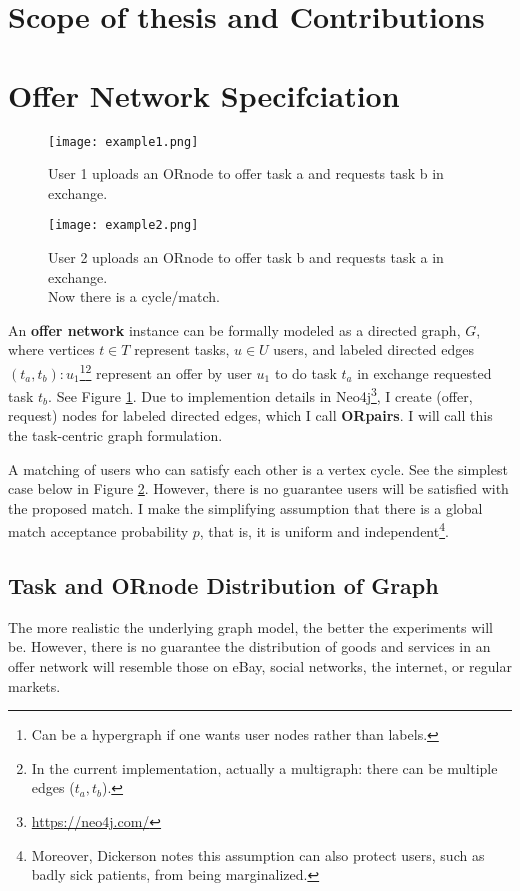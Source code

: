 \documentclass[main.tex]{subfiles}
\begin{document}
\section{Scope of thesis and Contributions}


\section{Offer Network Specifciation}

\begin{figure}
  \texttt{[image: example1.png]}
  \caption{User 1 uploads an ORnode to offer task a and requests task b in exchange.}
  \label{example1}
\end{figure}

\begin{figure}
  \texttt{[image: example2.png]}
  \caption{User 2 uploads an ORnode to offer task b and requests task a in exchange.
           \\Now there is a cycle/match.}
  \label{example2}
\end{figure}

An \textbf{offer network} instance can be formally modeled as a directed graph, $G$, where vertices $t \in T$ represent tasks, $u \in U$ users, and labeled directed edges $(t_a,t_b) : u_1$\footnote{Can be a hypergraph if one wants user nodes rather than labels.}\footnote{In the current implementation, actually a multigraph: there can be multiple edges ($t_a,t_b$).} represent an offer by user $u_1$ to do task $t_a$ in exchange requested task $t_b$. See Figure \ref{example1}. Due to implemention details in Neo4j\footnote{\url{https://neo4j.com/}}, I create (offer, request) nodes for labeled directed edges, which I call \textbf{ORpairs}. I will call this the task-centric graph formulation.

A matching of users who can satisfy each other is a vertex cycle. See the simplest case below in Figure \ref{example2}. However, there is no guarantee users will be satisfied with the proposed match. I make the simplifying assumption that there is a global match acceptance probability $p$, that is, it is uniform and independent\footnote{Moreover, Dickerson \cite{Dick} notes this assumption can also protect users, such as badly sick patients, from being marginalized.}.

\subsection{Task and ORnode Distribution of Graph}
The more realistic the underlying graph model, the better the experiments will be. However, there is no guarantee the distribution of goods and services in an offer network will resemble those on eBay, social networks, the internet, or regular markets.
\end{document}
